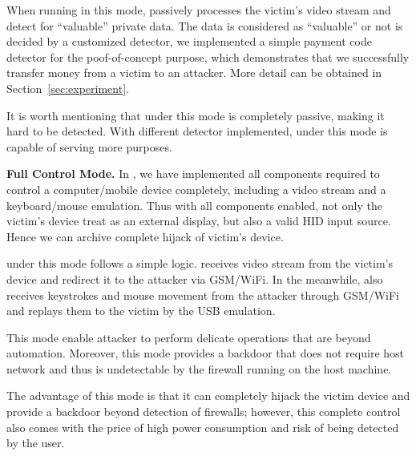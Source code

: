 When running in this mode, \tool passively processes the victim's video stream
and detect for ``valuable'' private data.  The data is considered as
``valuable'' or not is decided by a customized detector, we implemented a simple
payment code detector for the poof-of-concept purpose, which demonstrates that we successfully transfer money from a victim to an
attacker. More detail can be obtained in Section~\ref{sec:experiment}.

It is worth mentioning that \tool under this mode is completely passive, making
it hard to be detected. With different detector implemented, \tool
under this mode is capable of serving more purposes.

\textbf{Full Control Mode.} In \tool, we have implemented all components
required to control a computer/mobile device completely, including a video stream
and a keyboard/mouse emulation. Thus with all components enabled, not only
the victim's device treat \tool as an external display, but also a valid HID
input source. Hence we can archive complete hijack of victim's device.

\tool under this mode follows a simple logic. \tool receives video stream
from the victim's device and redirect it to the attacker via GSM/WiFi. In the
meanwhile, \tool also receives keystrokes and mouse movement from the attacker
through GSM/WiFi and replays them to the victim by the USB emulation.

This mode enable attacker to perform delicate operations that are beyond
automation. Moreover, this mode provides a backdoor that does not require host
network and thus is undetectable by the firewall running on the host machine.

The advantage of this mode is that it can completely hijack the victim device
and provide a backdoor beyond detection of firewalls; however, this complete control
also comes with the price of high power consumption and risk of being detected
by the user.

